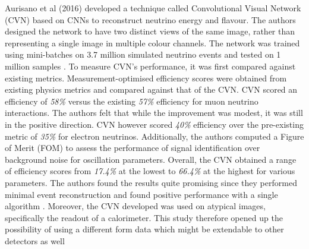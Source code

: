 Aurisano et al (2016) developed a technique called Convolutional Visual Network (CVN) based on CNNs to reconstruct neutrino energy and flavour. The authors designed the network to have two distinct views of the same image, rather than representing a single image in multiple colour channels. The network was trained using mini-batches on 3.7 million simulated neutrino events and tested on 1 million samples \cite{aurisano2016convolutional}. To measure CVN's performance, it was first compared against existing metrics. Measurement-optimised efficiency scores were obtained from existing physics metrics and compared against that of the CVN. CVN scored an efficiency of \textit{58\%} versus the existing \textit{57\%} efficiency for muon neutrino interactions. The authors felt that while the improvement was modest, it was still in the positive direction. CVN however scored \textit{40\%} efficiency over the pre-existing metric of \textit{35\%} for electron neutrinos. Additionally, the authors computed a Figure of Merit (FOM) to assess the performance of signal identification over background noise for oscillation parameters. Overall, the CVN obtained a range of efficiency scores from \textit{17.4\%} at the lowest to \textit{66.4\%} at the highest for various parameters. The authors found the results quite promising since they performed minimal event reconstruction and found positive performance with a single algorithm \cite{aurisano2016convolutional}. Moreover, the CVN developed was used on atypical images, specifically the readout of a calorimeter. This study therefore opened up the possibility of using a different form data which might be extendable to other detectors as well

